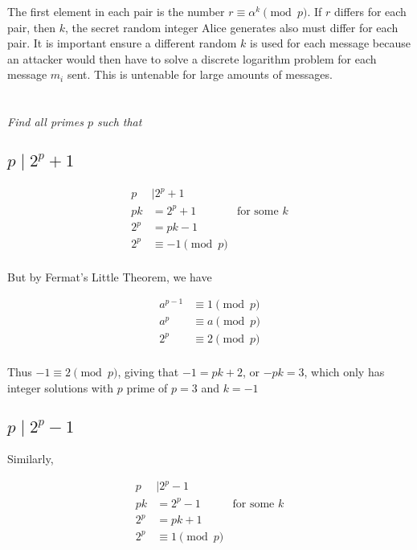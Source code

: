 \documentclass[12pt]{article}
\begin{document}
    The first element in each pair is the number $r \equiv \alpha^k \pmod{p}$. If $r$ differs for each pair, then $k$, the secret random integer Alice generates also must differ for each pair. It is important ensure a different random $k$ is used for each message because an attacker would then have to solve a discrete logarithm problem for each message $m_i$ sent. This is untenable for large amounts of messages.

\section{} \textit{Find all primes $p$ such that}

    \subsection{$p \mid 2^p + 1$}

        \begin{align*}
            p &\mid 2^p + 1\\
            pk &= 2^p + 1 &\text{for some $k$}\\
            2^p &= pk - 1\\
            2^p &\equiv -1 \pmod{p}\\
        \end{align*}

        But by Fermat's Little Theorem, we have

        \begin{align*}
            a^{p - 1} &\equiv 1 \pmod{p}\\
            a^p &\equiv a \pmod{p}\\
            2^p &\equiv 2 \pmod{p}\\
        \end{align*}

        Thus $-1 \equiv 2 \pmod{p}$, giving that $-1 = pk + 2$, or $-pk = 3$, which only has integer solutions with $p$ prime of $p=3$ and $k=-1$

    \subsection{$p \mid 2^p - 1$}

        Similarly,

        \begin{align*}
            p &\mid 2^p - 1\\
            pk &= 2^p - 1 &\text{for some $k$}\\
            2^p &= pk + 1\\
            2^p &\equiv 1 \pmod{p}\\
        \end{align*}
\end{document}
